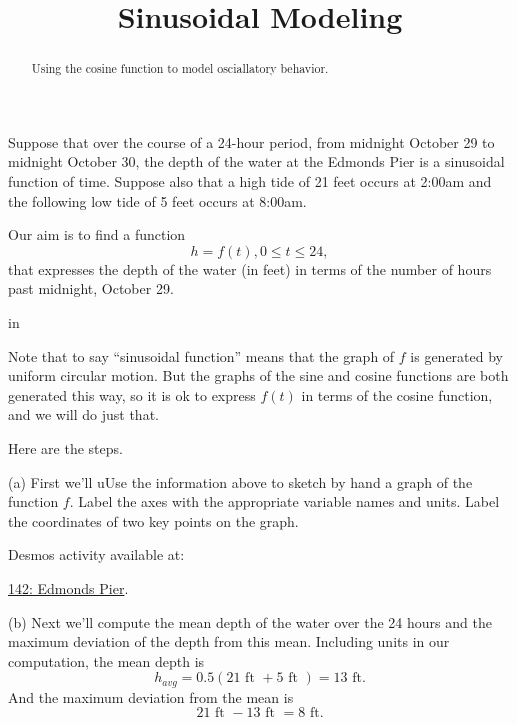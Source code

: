 \documentclass{ximera}
\title{Sinusoidal Modeling}
\newcommand{\pskip}{\vskip 0.1 in}
\begin{document}
\begin{abstract}
Using the cosine function to model osciallatory behavior.
\end{abstract}
\maketitle

\begin{example} \label{Efdgu7u67}
Suppose that over the course of a 24-hour period, from midnight October 29 to midnight October 30, the depth of the water at the Edmonds Pier is a sinusoidal function of time. Suppose also that a high tide of 21 feet occurs at 2:00am and the following low tide of 5 feet occurs at 8:00am. 


\begin{explanation}
Our aim is to find a function
\[
    h = f(t) , 0\leq t \leq 24, 
\]
that expresses the depth of the water (in feet) in terms of the number of hours past midnight, October 29. 

\pskip

Note that to say ``sinusoidal function'' means that the graph of $f$ is generated by uniform circular motion. But the graphs of the sine and cosine functions are both generated this way, so it is ok to express $f(t)$ in terms of the cosine function, and we will do just that.

Here are the steps.


(a) First we'll uUse the information above to sketch by hand a graph of the function $f$. Label the axes with the appropriate variable names and units. Label the coordinates of two key points on the graph.

Desmos activity available at:

\href{https://www.desmos.com/calculator/x2kocpkcfm}{142: Edmonds Pier}.

 
\begin{onlineOnly}
    \begin{center}
\end{center}
\end{onlineOnly}



(b) Next we'll compute the mean depth of the water over the 24 hours and the maximum deviation of the depth from this mean. Including units in our computation, the mean depth is 
\[
    h_{avg} = 0.5 ( 21 \text{ ft } + 5 \text{ ft }) = 13 \text{ ft} . 
\]
And the maximum deviation from the mean is
\[
     21 \text{ ft } - 13 \text{ ft } = 8 \text{ ft}.
\]


\end{explanation}
\end{example}
\end{document}
